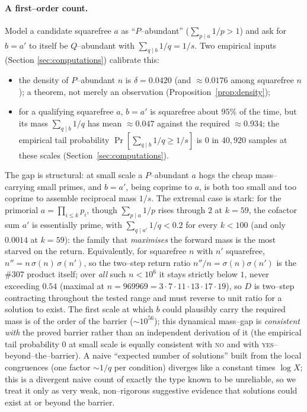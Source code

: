\documentclass[11pt]{article}
\theoremstyle{definition}
\begin{document}
\paragraph{A first--order count.}
Model a candidate squarefree $a$ as ``$P$--abundant'' ($\sum_{p\mid a}1/p>1$) and ask for
$b=a'$ to itself be $Q$--abundant with $\sum_{q\mid b}1/q=1/s$. Two empirical inputs (Section
\ref{sec:computations}) calibrate this:
\begin{itemize}[leftmargin=1.4em]
\item the density of $P$--abundant $n$ is $\delta=0.0420$ (and $\approx0.0176$ among squarefree
$n$); a theorem, not merely an observation (Proposition~\ref{prop:density});
\item for a qualifying squarefree $a$, $b=a'$ is squarefree about $95\%$ of the time, but its mass
$\sum_{q\mid b}1/q$ has mean $\approx0.047$ against the required $\approx0.934$; the empirical tail
probability $\Pr[\sum_{q\mid b}1/q\ge 1/s]$ is $0$ in $40{,}920$ samples at these scales
(Section~\ref{sec:computations}).
\end{itemize}
The gap is structural: at small scale a $P$--abundant $a$ hogs the cheap mass--carrying small primes,
and $b=a'$, being coprime to $a$, is both too small and too coprime to assemble reciprocal mass
$1/s$. The extremal case is stark: for the primorial $a=\prod_{i\le k}p_i$, though $\sum_{p\mid a}1/p$
rises through $2$ at $k=59$, the cofactor sum $a'$ is essentially prime, with $\sum_{q\mid a'}1/q<0.2$
for every $k<100$ (and only $0.0014$ at $k=59$): the family that \emph{maximises} the forward mass is
the most starved on the return. Equivalently, for squarefree $n$ with $n'$ squarefree,
$n''=n\,\sigma(n)\,\sigma(n')$, so the two--step return ratio $n''/n=\sigma(n)\sigma(n')$ is the \#307
product itself; over \emph{all} such $n<10^6$ it stays strictly below $1$, never exceeding $0.54$
(maximal at $n=969969=3\cdot7\cdot11\cdot13\cdot17\cdot19$), so $D$ is two--step contracting throughout
the tested range and must reverse to unit ratio for a solution to exist. The first scale at which $b$
could plausibly carry the required mass is of the order of the
barrier ($\sim10^{56}$); this dynamical mass--gap is \emph{consistent with} the proved barrier rather
than an independent derivation of it (the empirical tail probability $0$ at small scale is equally
consistent with \textsc{no} and with \textsc{yes}--beyond--the--barrier). A naive ``expected number
of solutions'' built from the local congruences (one factor $\sim1/q$ per condition) diverges like a
constant times $\log X$; this is a divergent naive count of exactly the type known to be unreliable,
so we treat it only as very weak, non--rigorous suggestive evidence that solutions could exist at or
beyond the barrier.
\end{document}
